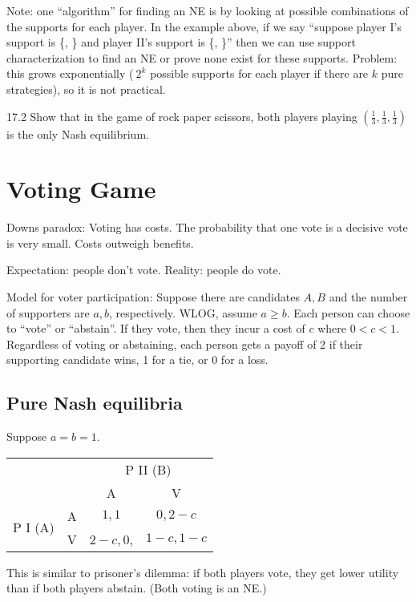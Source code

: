 \documentclass[12pt,letterpaper]{report}
\begin{document}
Note: one ``algorithm'' for finding an NE is by looking at possible combinations of the supports for
each player.
In the example above, if we say ``suppose player I's support is \{, \} and player
II's support is \{, \}'' then we can use support characterization to find an NE or
prove none exist for these supports.
Problem: this grows exponentially ($~2^k$ possible supports for each player if there are $k$ pure
strategies), so it is not practical.

\begin{exer}{}{17.2}
  Show that in the game of rock paper scissors, both players playing $(\frac{1}{3}, \frac{1}{3},
  \frac{1}{3})$ is the only Nash equilibrium.
\end{exer}

\section{Voting Game}

Downs paradox: Voting has costs.
The probability that one vote is a decisive vote is very small.
Costs outweigh benefits.

Expectation: people don't vote.
Reality: people do vote.

Model for voter participation: Suppose there are candidates $A, B$ and the number of supporters are
$a, b$, respectively.
WLOG, assume $a \geq b$.
Each person can choose to ``vote'' or ``abstain''.
If they vote, then they incur a cost of $c$ where $0 < c < 1$.
Regardless of voting or abstaining, each person gets a payoff of 2 if their supporting candidate
wins, 1 for a tie, or 0 for a loss.

\subsection{Pure Nash equilibria}

Suppose $a = b = 1$.
\begin{center}
  \renewcommand{\arraystretch}{1.25}
  \begin{tabular}{c c|c|c|}
    \multicolumn{2}{c}{} & \multicolumn{2}{c}{P II (B)} \\
    \multicolumn{2}{c}{} & \multicolumn{1}{c}{A} & \multicolumn{1}{c}{V} \\
    \cline{3-4}
    \multirow{2}{*}{P I (A)} & A & $1, 1$ & $0, 2 - c$ \\
    \cline{3-4}
    & V & $2 - c, 0$, & $1 - c, 1 - c$ \\
    \cline{3-4}
  \end{tabular}
\end{center}
This is similar to prisoner's dilemma: if both players vote, they get lower utility than if both
players abstain.
(Both voting is an NE.)
\end{document}
